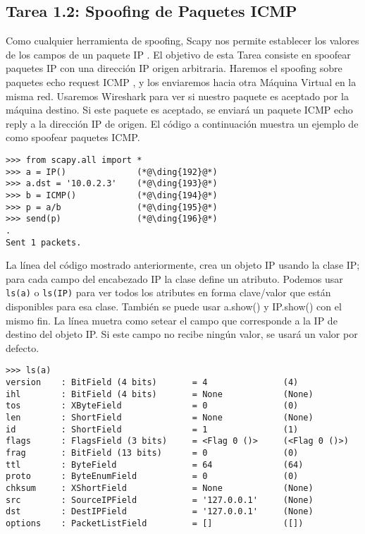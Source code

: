 \subsection{Tarea 1.2: Spoofing de Paquetes ICMP}

Como cualquier herramienta de spoofing, Scapy nos permite establecer los valores de los campos de un paquete IP . El objetivo de esta Tarea consiste en spoofear paquetes IP con una dirección IP origen arbitraria.
Haremos el spoofing sobre paquetes echo request ICMP , y los enviaremos hacia otra Máquina Virtual en la misma red. Usaremos Wireshark para ver si nuestro paquete es aceptado por la máquina destino. Si este paquete es aceptado, se enviará un paquete ICMP echo reply a la dirección IP de origen.
El código a continuación muestra un ejemplo de como spoofear paquetes ICMP.

\begin{lstlisting}
>>> from scapy.all import *
>>> a = IP()              (*@\ding{192}@*)
>>> a.dst = '10.0.2.3'    (*@\ding{193}@*)
>>> b = ICMP()            (*@\ding{194}@*)
>>> p = a/b               (*@\ding{195}@*)
>>> send(p)               (*@\ding{196}@*)
.
Sent 1 packets.
\end{lstlisting}
 
La línea  del código mostrado anteriormente, crea un objeto IP usando la clase IP; para cada campo del encabezado IP la clase define un atributo. Podemos usar \texttt{ls(a)} o \texttt{ls(IP)} para ver todos los atributes en forma clave/valor que están disponibles para esa clase. También se puede usar a.show() y IP.show() con el mismo fin. La línea  muetra como setear el campo que corresponde a la IP de destino del objeto IP. Si este campo no recibe ningún valor, se usará un valor por defecto.

\begin{lstlisting}
>>> ls(a)
version    : BitField (4 bits)       = 4               (4)
ihl        : BitField (4 bits)       = None            (None)
tos        : XByteField              = 0               (0)
len        : ShortField              = None            (None)
id         : ShortField              = 1               (1)
flags      : FlagsField (3 bits)     = <Flag 0 ()>     (<Flag 0 ()>)
frag       : BitField (13 bits)      = 0               (0)
ttl        : ByteField               = 64              (64)
proto      : ByteEnumField           = 0               (0)
chksum     : XShortField             = None            (None)
src        : SourceIPField           = '127.0.0.1'     (None)
dst        : DestIPField             = '127.0.0.1'     (None)
options    : PacketListField         = []              ([])
\end{lstlisting}
 

